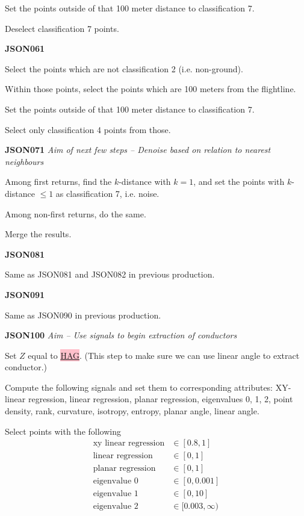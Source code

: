 \documentclass[a4paper,11pt,twoside]{article}
\theoremstyle{definition}
\theoremstyle{remark}
\newcommand{\sh}[1]{\colorbox{pink}{#1}}
\begin{document}
\begin{list}{}{}
\item Set the points outside of that 100 meter distance to classification 7.
\item Deselect classification 7 points.
\item \textbf{JSON061}
\item Select the points which are not classification 2 (i.e. non-ground).
\item Within those points, select the points which are 100 meters from the flightline.
\item Set the points outside of that 100 meter distance to classification 7.
\item Select only classification 4 points from those.
\item \textbf{JSON071}
\emph{Aim of next few steps -- Denoise based on relation to nearest neighbours}
\item Among first returns, find the $k$-distance with $k=1$, and set the points with $k$-distance $\leqslant 1$ as classification 7, i.e. noise.
\item Among non-first returns, do the same.
\item Merge the results.
\item \textbf{JSON081}
\item Same as JSON081 and JSON082 in previous production.
\item \textbf{JSON091}
\item Same as JSON090 in previous production.
\item \textbf{JSON100}
\emph{Aim -- Use signals to begin extraction of conductors}
\item Set $Z$ equal to \hyperref[smrf]{\sh{HAG}}. (This step to make sure we can use linear angle to extract conductor.)
\item Compute the following signals and set them to corresponding attributes: XY-linear regression, linear regression, planar regression, eigenvalues 0, 1, 2, point density, rank, curvature, isotropy, entropy, planar angle, linear angle.
\item Select points with the following
\begin{align*}
\text{xy linear regression}&\in[0.8,1]\\
\text{linear regression}&\in [0,1]\\
\text{planar regression}&\in[0,1]\\
\text{eigenvalue 0}&\in[0,0.001]\\
\text{eigenvalue 1}&\in[0,10]\\
\text{eigenvalue 2}&\in[0.003,\infty)\\

\end{align*}
\end{list}
\end{document}
